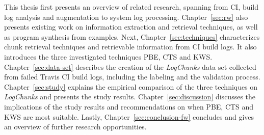 \documentclass[\myrootdir/main.tex]{subfiles}
\begin{document}
This thesis first presents an overview of related research, spanning from CI, build log analysis and augmentation to system log processing.
Chapter~\ref{sec:rw} also presents existing work on information extraction and retrieval techniques, as well as program synthesis from examples.
Next, Chapter~\ref{sec:techniques} characterizes chunk retrieval techniques and retrievable information from CI build logs.
It also introduces the three investigated techniques PBE, CTS and KWS\@.
Chapter~\ref{sec:data-set} describes the creation of the \emph{LogChunks} data set collected from failed Travis CI build logs, including the labeling and the validation process.
Chapter~\ref{sec:study} explains the empirical comparison of the three techniques on \emph{LogChunks} and presents the study results.
Chapter~\ref{sec:discussion} discusses the implications of the study results and recommendations on when PBE, CTS and KWS are most suitable.
Lastly, Chapter~\ref{sec:conclusion-fw} concludes and gives an overview of further research opportunities.%




\end{document}
